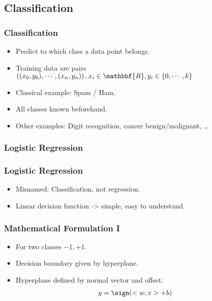 \subsection{Classification}
\begin{frame}
    \frametitle{Classification}
    \begin{itemize}
        \item Predict to which class a data point belongs.
        \item Training data are pairs $\left( (x_0, y_0), \cdots, (x_n, y_n) \right), x_i \in \mathbbf{R}, y_i \in \{0, \cdots, k\}$
        \item Classical example: Spam / Ham.
        \item All classes known beforehand.
        \item Other examples: Digit recognition, cancer benign/malignant, \ldots
    \end{itemize}
\end{frame}

\subsubsection{Logistic Regression}
\begin{frame}
    \frametitle{Logistic Regression}
    \begin{itemize}
        \item Misnamed: Classification, not regression.
        \item Linear decision function -> simple, easy to understand.
    \end{itemize}
\end{frame}

\begin{frame}
    \frametitle{Mathematical Formulation I}
    \begin{itemize}
        \item For two classes $-1, +1$.
        \item Decision boundary given by hyperplane.
        \item Hyperplane defined by normal vector and offset:
            \begin{align}
            y = \sign(<w, x> + b)
            \end{align}
    \end{itemize}
\end{frame}

